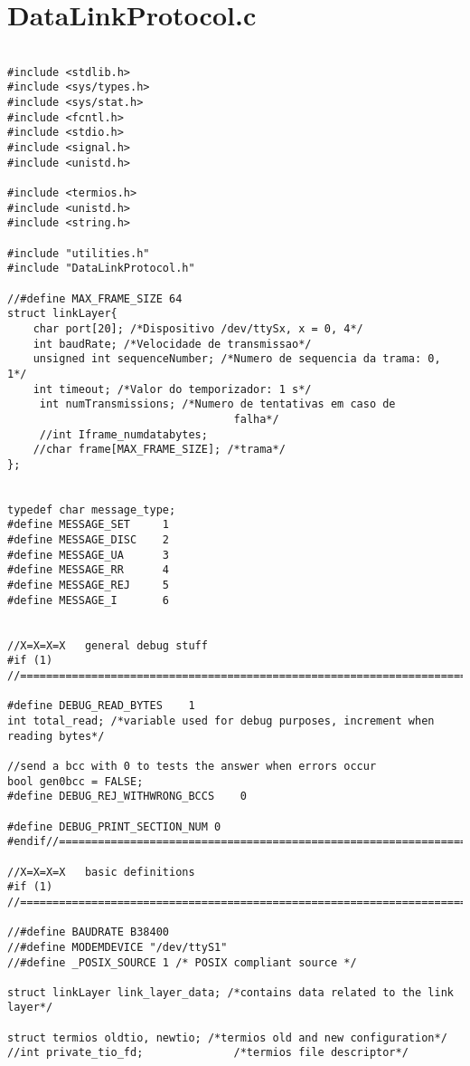 \section{DataLinkProtocol.c}
\label{DATALINKPROTOCOLC}

\begin{lstlisting}

#include <stdlib.h>
#include <sys/types.h>
#include <sys/stat.h>
#include <fcntl.h>
#include <stdio.h>
#include <signal.h>
#include <unistd.h>

#include <termios.h>
#include <unistd.h>
#include <string.h>

#include "utilities.h"
#include "DataLinkProtocol.h"

//#define MAX_FRAME_SIZE 64
struct linkLayer{
	char port[20]; /*Dispositivo /dev/ttySx, x = 0, 4*/
	int baudRate; /*Velocidade de transmissao*/
	unsigned int sequenceNumber; /*Numero de sequencia da trama: 0, 1*/
	int timeout; /*Valor do temporizador: 1 s*/
	 int numTransmissions; /*Numero de tentativas em caso de
								   falha*/
	 //int Iframe_numdatabytes;
	//char frame[MAX_FRAME_SIZE]; /*trama*/
};


typedef char message_type;
#define MESSAGE_SET		1
#define MESSAGE_DISC	2
#define MESSAGE_UA		3
#define MESSAGE_RR		4
#define MESSAGE_REJ		5
#define MESSAGE_I		6


//X=X=X=X   general debug stuff
#if (1)
//===============================================================================

#define DEBUG_READ_BYTES 	1
int total_read; /*variable used for debug purposes, increment when reading bytes*/

//send a bcc with 0 to tests the answer when errors occur
bool gen0bcc = FALSE;
#define DEBUG_REJ_WITHWRONG_BCCS 	0

#define DEBUG_PRINT_SECTION_NUM 0
#endif//==========================================================================

//X=X=X=X   basic definitions
#if (1)
//===============================================================================

//#define BAUDRATE B38400
//#define MODEMDEVICE "/dev/ttyS1"
//#define _POSIX_SOURCE 1 /* POSIX compliant source */

struct linkLayer link_layer_data; /*contains data related to the link layer*/

struct termios oldtio, newtio; /*termios old and new configuration*/
//int private_tio_fd;			   /*termios file descriptor*/


\end{lstlisting}
